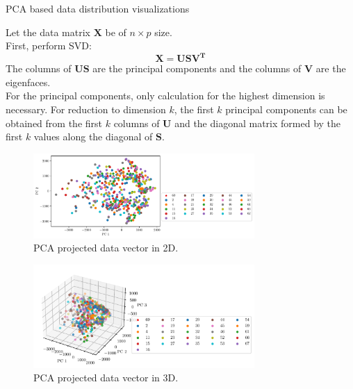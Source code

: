 \documentclass[a4paper]{exam}
\begin{document}
\begin{questions}
    \question PCA based data distribution visualizations

    Let the data matrix $\mathbf{X}$ be of $n \times p$ size.\\
    First, perform SVD:
    \begin{equation}
        \mathbf{X}=\mathbf{USV^T}
    \end{equation}
    The columns of $\mathbf{US}$ are the principal components and the columns of $\mathbf{V}$ are the eigenfaces.\\
    For the principal components, only calculation for the highest dimension is necessary. For reduction to
    dimension $k$, the first $k$ principal components can be obtained from the first $k$ columns of
    $\mathbf{U}$ and the diagonal matrix formed by the first $k$ values along the diagonal of $\mathbf{S}$.

    \begin{figure}[h]
        \centering
        \includegraphics[width=0.75\textwidth]{pca_2d}
        \caption{PCA projected data vector in 2D.}
        \label{fig:pca_2d}
    \end{figure}

    \begin{figure}[ht]
        \centering
        \includegraphics[width=0.75\textwidth]{pca_3d}
        \caption{PCA projected data vector in 3D.}
        \label{fig:pca_3d}
    \end{figure}


\end{questions}
\end{document}
